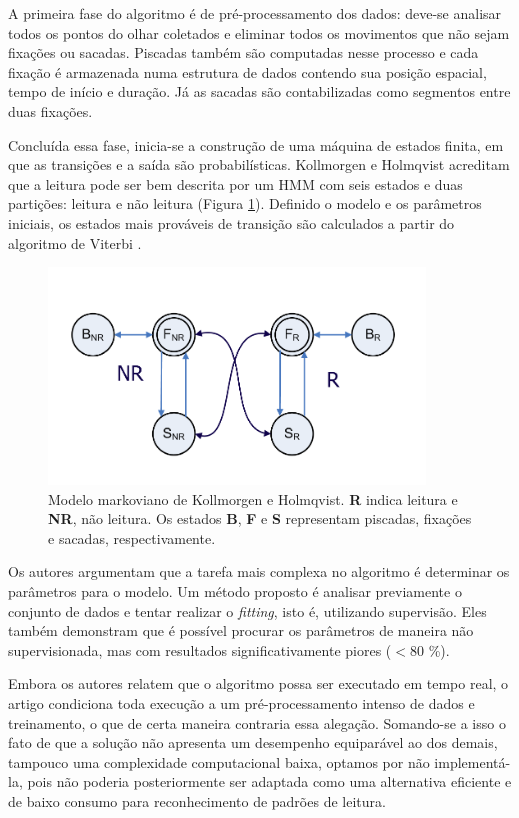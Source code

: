\documentclass[12pt]{article}
\begin{document}
		A primeira fase do algoritmo é de pré-processamento dos dados: deve-se analisar todos os pontos do olhar coletados e eliminar todos os movimentos que não sejam fixações ou sacadas. Piscadas também são computadas nesse processo e cada fixação é armazenada numa estrutura de dados contendo sua posição espacial, tempo de início e duração. Já as sacadas são contabilizadas como segmentos entre duas fixações.
		
		Concluída essa fase, inicia-se a construção de uma máquina de estados finita, em que as transições e a saída são probabilísticas. Kollmorgen e Holmqvist acreditam que a leitura pode ser bem descrita por um HMM com seis estados e duas partições: leitura e não leitura (Figura \ref{fig:kollmorgen}). Definido o modelo e os parâmetros iniciais, os estados mais prováveis de transição são calculados a partir do algoritmo de Viterbi \cite{Rabiner-1989}.
		
		\begin{figure}[!ht]
			\centering
			\includegraphics[width=10cm]{imgs/kollmorgen.png}
			\caption{\footnotesize {Modelo markoviano de Kollmorgen e Holmqvist. \textbf{R} indica leitura e \textbf{NR}, não leitura. Os estados \textbf{B}, \textbf{F} e \textbf{S} representam piscadas, fixações e sacadas, respectivamente.}}
			\label{fig:kollmorgen}
			\vspace{5mm}
		\end{figure}
		
		Os autores argumentam que a tarefa mais complexa no algoritmo é determinar os parâmetros para o modelo. Um método proposto é analisar previamente o conjunto de dados e tentar realizar o \textit{fitting}, isto é, utilizando supervisão. Eles também demonstram que é possível procurar os parâmetros de maneira não supervisionada, mas com resultados significativamente piores ($<$80 \%).		
		
		Embora os autores relatem que o algoritmo possa ser executado em tempo real, o artigo condiciona toda execução a um pré-processamento intenso de dados e treinamento, o que de certa maneira contraria essa alegação. Somando-se a isso o fato de que a solução não apresenta um desempenho equiparável ao dos demais, tampouco uma complexidade computacional baixa, optamos por não implementá-la, pois não poderia posteriormente ser adaptada como uma alternativa eficiente e de baixo consumo para reconhecimento de padrões de leitura.   
		
\end{document}
